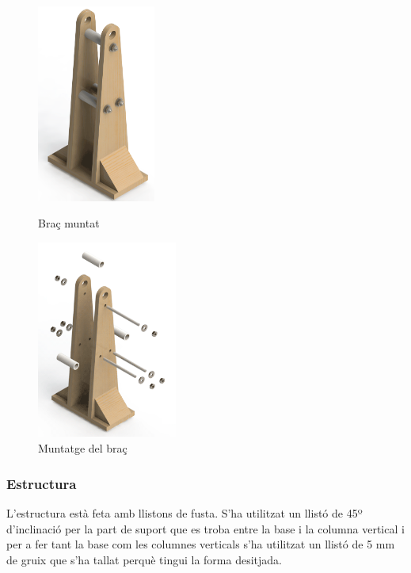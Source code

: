 \documentclass[a4paper, 12pt]{article}
\begin{document}
\begin{figure}[h!]
\begin{minipage}[b]{0.45\linewidth}
\centering
\includegraphics[height=6.5cm]{./imgComp/brac}
\caption{Braç muntat}
\end{minipage}
\begin{minipage}[b]{0.45\linewidth}
\centering
\includegraphics[height=6.5cm]{./imgComp/brac_expl}
\caption{Muntatge del braç}
\end{minipage}
\end{figure}

\subsubsection{Estructura}
L'estructura està feta amb llistons de fusta. S'ha utilitzat un llistó de 45º d'inclinació per la part de suport que es troba entre la base i la columna vertical i per a fer tant la base com les columnes verticals s'ha utilitzat un llistó de 5 mm de gruix que s'ha tallat perquè tingui la forma desitjada. 
\end{document}
